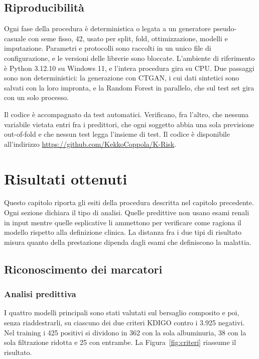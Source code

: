 \documentclass[a4paper, 12pt, oneside]{book}
\begin{document}
\section{Riproducibilità}

Ogni fase della procedura è deterministica o legata a un generatore pseudo-casuale con seme fisso, 42, usato per split, fold, ottimizzazione, modelli e imputazione. Parametri e protocolli sono raccolti in un unico file di configurazione, e le versioni delle librerie sono bloccate. L'ambiente di riferimento è Python 3.12.10 su Windows 11, e l'intera procedura gira su CPU. Due passaggi sono non deterministici: la generazione con CTGAN, i cui dati sintetici sono salvati con la loro impronta, e la Random Forest in parallelo, che sul test set gira con un solo processo.

Il codice è accompagnato da test automatici. Verificano, fra l'altro, che nessuna variabile vietata entri fra i predittori, che ogni soggetto abbia una sola previsione out-of-fold e che nessun test legga l'insieme di test. Il codice è disponibile all'indirizzo \url{https://github.com/KekkoCoppola/K-Risk}.

\chapter{Risultati ottenuti}

Questo capitolo riporta gli esiti della procedura descritta nel capitolo precedente. Ogni sezione dichiara il tipo di analisi. Quelle predittive non usano esami renali in input mentre quelle esplicative li ammettono per verificare come ragiona il modello rispetto alla definizione clinica. La distanza fra i due tipi di risultato misura quanto della prestazione dipenda dagli esami che definiscono la malattia.

\section{Riconoscimento dei marcatori}

\subsection{Analisi predittiva}

I quattro modelli principali sono stati valutati sul bersaglio composito e poi, senza riaddestrarli, su ciascuno dei due criteri KDIGO contro i 3.925 negativi. Nel training i 425 positivi si dividono in 362 con la sola albuminuria, 38 con la sola filtrazione ridotta e 25 con entrambe. La Figura~\ref{fig:criteri} riassume il risultato.
\end{document}
